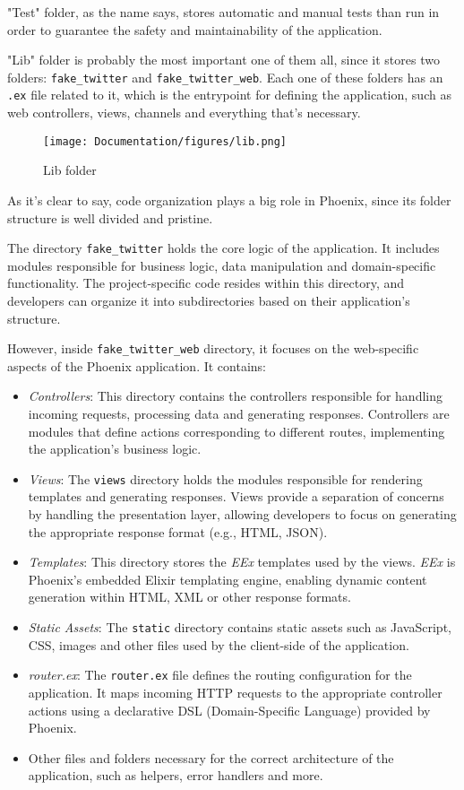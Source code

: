 "Test" folder, as the name says, stores automatic and manual tests than run in order to guarantee the safety and maintainability of the application.

"Lib" folder is probably the most important one of them all, since it stores two folders: \texttt{fake\_twitter} and \texttt{fake\_twitter\_web}. Each one of these folders has an \texttt{.ex} file related to it, which is the entrypoint for defining the application, such as web controllers, views, channels and everything that's necessary.

\begin{figure}[htbp]
	\centering
	\texttt{[image: Documentation/figures/lib.png]}  %
	\caption{Lib folder}
	\label{fig:phx}
\end{figure}

As it's clear to say, code organization plays a big role in Phoenix, since its folder structure is well divided and pristine. 

The directory \texttt{fake\_twitter} holds the core logic of the application. It includes modules responsible for business logic, data manipulation and domain-specific functionality. The project-specific code resides within this directory, and developers can organize it into subdirectories based on their application's structure.


However, inside \texttt{fake\_twitter\_web} directory, it focuses on the web-specific aspects of the Phoenix application. It contains:

\begin{itemize}
    \item \textit{Controllers}: This directory contains the controllers responsible for handling incoming requests, processing data and generating responses. Controllers are modules that define actions corresponding to different routes, implementing the application's business logic.
    \item \textit{Views}: The \texttt{views} directory holds the modules responsible for rendering templates and generating responses. Views provide a separation of concerns by handling the presentation layer, allowing developers to focus on generating the appropriate response format (e.g., HTML, JSON).
    \item \textit{Templates}: This directory stores the \textit{EEx} templates used by the views. \textit{EEx} is Phoenix's embedded Elixir templating engine, enabling dynamic content generation within HTML, XML or other response formats.
    \item \textit{Static Assets}: The \texttt{static} directory contains static assets such as JavaScript, CSS, images and other files used by the client-side of the application.
    \item \textit{router.ex}: The \texttt{router.ex} file defines the routing configuration for the application. It maps incoming HTTP requests to the appropriate controller actions using a declarative DSL (Domain-Specific Language) provided by Phoenix.
    \item Other files and folders necessary for the correct architecture of the application, such as helpers, error handlers and more.
\end{itemize}

